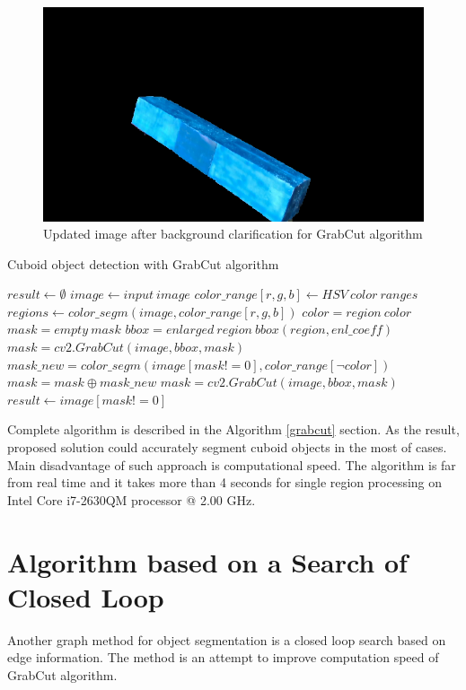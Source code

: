 \documentclass{ctuthesis}
\begin{document}
\begin{figure}[htbp]
    \centering
    \includegraphics[width=12cm]{GrabCut_result_updated.png}
    \caption{Updated image after background clarification for GrabCut algorithm}
    \label{fig:GrabCut_final}
\end{figure}


\begin{algorithm}
\caption{Cuboid object detection with GrabCut algorithm}\label{grabcut}
\begin{algorithmic}[1]
\State $result \gets \emptyset$
\State $image \gets input\ image$
\State $color\_range[r,g,b] \gets HSV\ color\ ranges$
\State $regions \gets color\_segm(image, color\_range[r,g,b])$
\State $color = region\ color$
\State $mask = empty\ mask$
\State $bbox = enlarged\ region\ bbox(region, enl\_coeff)$
\State $mask = cv2.GrabCut(image, bbox, mask)$
\State $mask\_new = color\_segm(image[mask != 0], color\_range[\lnot color])$
\State $mask = mask \oplus mask\_new$
\State $mask = cv2.GrabCut(image, bbox, mask)$
\State $result \gets image[mask != 0]$
\EndFor

\end{algorithmic}
\end{algorithm}



Complete algorithm is described in the Algorithm \ref{grabcut} section. As the result, proposed solution could accurately segment cuboid objects in the most of cases. Main disadvantage of such approach is computational speed. The algorithm is far from real time and it takes more than 4 seconds for single region processing on Intel Core i7-2630QM processor @ 2.00 GHz.

\section{Algorithm based on a Search of Closed Loop}
Another graph method for object segmentation is a closed loop search based on edge information. The method is an attempt to improve computation speed of GrabCut algorithm.
\end{document}
